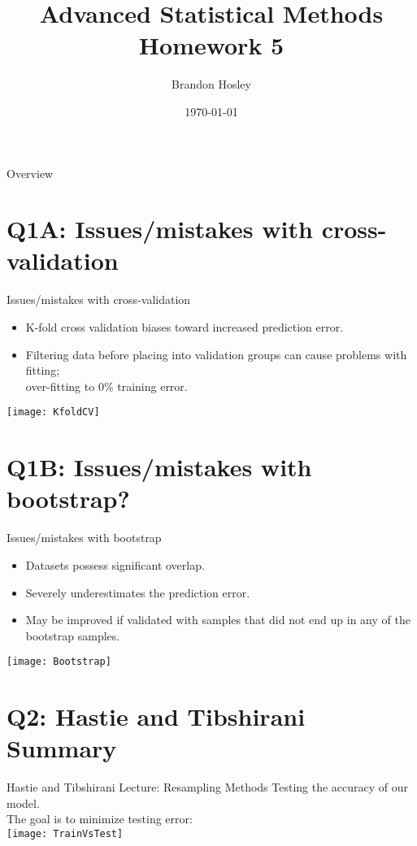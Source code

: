 \documentclass{beamer}
\title{Advanced Statistical Methods \\ Homework 5}
\author{Brandon Hosley}
\institute{University of Illinois - Springfield}
\date{\today}
\begin{document}
\frame{\titlepage}

\begin{frame}{Overview}
\tableofcontents
\end{frame}

\section[Q1A]{Q1A: Issues/mistakes with cross-validation}

\begin{frame}{Issues/mistakes with cross-validation}
	\begin{itemize}[<+->]
		\item K-fold cross validation biases toward increased prediction error.
		\item Filtering data before placing into validation groups can cause problems with fitting; \\ over-fitting to 0\% training error.
	\end{itemize}
	\vspace{1em}
	\centering 
	\texttt{[image: KfoldCV]}
	\vspace{1em}
\end{frame}

\section[Q1B]{Q1B: Issues/mistakes with bootstrap?}
\begin{frame}{Issues/mistakes with bootstrap}
	\begin{itemize}[<+->]
		\item Datasets possess significant overlap.
		\item Severely underestimates the prediction error.
		\item May be improved if validated with samples that did not end up in any of the bootstrap samples.
	\end{itemize}
	\vspace{1em}
	\centering 
	\texttt{[image: Bootstrap]}
	\vspace{1em}
\end{frame}

\section[Q2]{Q2: Hastie and Tibshirani Summary}

\begin{frame}{Hastie and Tibshirani Lecture: Resampling Methods}
	Testing the accuracy of our model. \\
	The goal is to minimize testing error: \\
	\vspace{1em}
	\centering 
	\texttt{[image: TrainVsTest]}
	\vspace{1em}
\end{frame}
\end{document}
